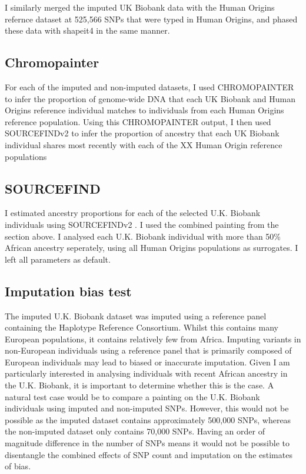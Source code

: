 I similarly merged the imputed UK Biobank data with the Human Origins refernce dataset at 525,566 SNPs that were typed in Human Origins, and phased these data with shapeit4 in the same manner.

\subsection{Chromopainter}

For each of the imputed and non-imputed datasets, I used CHROMOPAINTER to infer the proportion of genome-wide DNA that each UK Biobank and Human Origins reference individual matches to individuals from each Human Origins reference population. Using this CHROMOPAINTER output, I then used SOURCEFINDv2 \cite{Chacon-Duque2018} to infer the proportion of ancestry that each UK Biobank individual shares most recently with each of the XX Human Origin reference populations

\subsection{SOURCEFIND}

I estimated ancestry proportions for each of the selected U.K. Biobank individuals using SOURCEFINDv2 \cite{Chacon-Duque2018}. I used the combined painting from the section above. I analysed each U.K. Biobank individual with more than 50\% African ancestry seperately, using all Human Origins populations as surrogates. I left all parameters as default. 

\subsection{Imputation bias test}

The imputed U.K. Biobank dataset was imputed using a reference panel containing the Haplotype Reference Consortium. Whilst this contains many European populations, it contains relatively few from Africa. Imputing variants in non-European individuals using a reference panel that is primarily composed of European individuals may lead to biased or inaccurate imputation. Given I am particularly interested in analysing individuals with recent African ancestry in the U.K. Biobank, it is important to determine whether this is the case. A natural test case would be to compare a painting on the U.K. Biobank individuals using imputed and non-imputed SNPs. However, this would not be possible as the imputed dataset contains approximately 500,000 SNPs, whereas the non-imputed dataset only contains 70,000 SNPs. Having an order of magnitude difference in the number of SNPs means it would not be possible to disentangle the combined effects of SNP count and imputation on the estimates of bias.   

